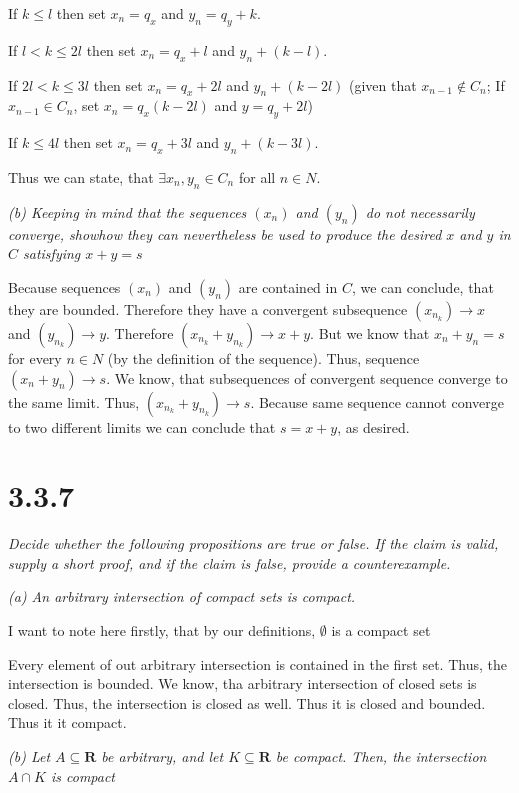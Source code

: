 \documentclass[11pt,oneside,titlepage]{article}
\begin{document}
If $k \leq l$ then set $x_n = q_x$ and $y_n = q_y + k$.

If $l < k \leq 2l$ then set $x_n = q_x + l$ and $y_n + (k - l)$.

If $2l < k \leq 3l$ then set $x_n = q_x + 2l$ and $y_n + (k - 2l)$ (given that
$x_{n - 1} \notin C_n$; If $x_{n - 1} \in C_n$, set $x_n = q_x (k - 2l)$
and $y = q_y + 2l$)

If $k \leq 4l$ then set $x_n = q_x + 3l$ and $y_n + (k - 3l)$.

Thus we can state, that $\exists x_n, y_n \in C_n$ for all $n \in N$.

\textit{(b) Keeping in mind that the sequences $(x_n)$ and $(y_n)$ do not
  necessarily converge, showhow they can nevertheless be used to produce the
  desired $x$ and $y$ in $C$ satisfying $x + y = s$}

Because sequences $(x_n)$ and $(y_n)$ are contained in $C$, we can conclude,
that they are bounded. Therefore they have a convergent subsequence
$(x_{n_k}) \to x$ and $(y_{n_k}) \to y$.
Therefore $(x_{n_k} + y_{n_k}) \to x + y$.
But we know that  $x_n + y_n = s$ for every
$n \in N$ (by the definition of the sequence). Thus, sequence
$(x_n + y_n) \to s$. We know, that subsequences of convergent sequence converge
to the same limit. Thus, $(x_{n_k} + y_{n_k}) \to s$. Because same sequence
cannot converge to two different limits we can conclude that $s = x + y$,
as desired.

\section*{3.3.7}
\textit{Decide whether the following propositions are true or false. If the claim is valid, supply a short proof, and if the claim is false, provide a counterexample.}

\textit{(a) An arbitrary intersection of compact sets is compact.}

I want to note here firstly, that by our definitions, $\emptyset$ is a
compact set

Every element of out arbitrary intersection is contained in the first set.
Thus, the intersection is bounded. We know, tha arbitrary intersection of
closed sets is closed. Thus, the intersection is closed as well. Thus it
is closed and bounded. Thus it it compact.

\textit{(b) Let $A \subseteq \textbf{R}$ be arbitrary, and let
  $K \subseteq \textbf{R}$ be compact. Then, the intersection $A \cap K$ is
  compact}
\end{document}
